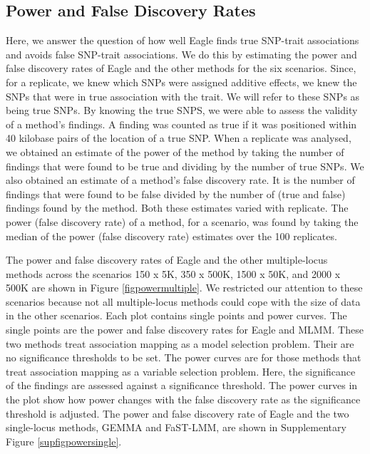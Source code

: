 \documentclass{article}
\begin{document}
 
 





\subsection{Power and False Discovery Rates}

Here, we answer the question of how well Eagle finds true SNP-trait associations and avoids false SNP-trait associations. We do this by estimating the power and false discovery rates of Eagle and the other methods for the six scenarios.  Since, for a replicate, we knew which SNPs were assigned additive effects, we knew the SNPs that were in true association with the trait. We will refer to these SNPs as being
true SNPs. By knowing the true SNPS, we were able to assess the validity of a method's findings. A  finding was counted as true if it was positioned within 40 kilobase pairs of the location of a true SNP. When a replicate was analysed, we obtained an estimate of the power of the method by taking  the number of findings that were found to be  true and dividing by the 
number of true SNPs. We also obtained an estimate of a method's false discovery rate. It is the number of findings that were found to be false divided by the number of (true and false) findings found by the method.  Both these estimates varied with replicate. 
The power (false discovery rate) of a method, for a scenario, was found by taking the median of the power (false discovery rate) estimates over the 100 replicates. 


The power and false discovery rates of Eagle and the other multiple-locus methods across the scenarios 150 x 5K, 350 x 500K, 1500 x 50K, and 2000 x 500K are shown in Figure \ref{figpowermultiple}.  We restricted our attention to these scenarios because not all 
multiple-locus methods could cope with the size of data in the other scenarios. 
  Each plot contains 
single points and power curves. The single points are the power and false discovery rates for Eagle and MLMM.
These two methods treat association mapping as a model selection problem. Their are no significance thresholds to be set. 
The power curves are for those methods that treat association mapping as a variable selection problem. Here, the 
significance of the findings are assessed against a significance threshold. The power curves in the plot show how power changes with 
the false discovery rate as the significance threshold  is adjusted. 
The power and false discovery rate of Eagle and the two single-locus methods, GEMMA and FaST-LMM,  are shown in
Supplementary Figure \ref{supfigpowersingle}. 
\end{document}
